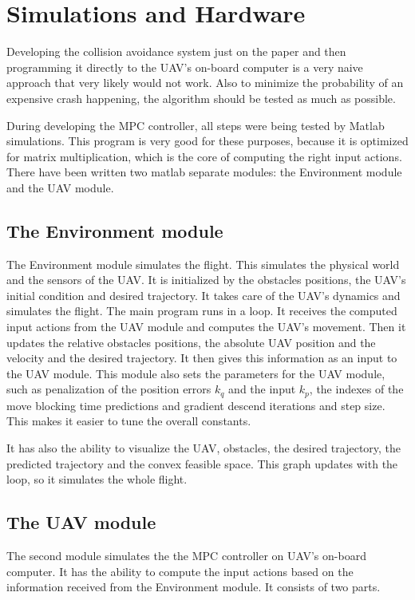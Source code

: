 \documentclass[a4paper,11pt,titlepage]{article}
\begin{document}
\section{Simulations and Hardware}

Developing the collision avoidance system just on the paper and then programming it directly to the UAV's on-board computer is a very naive approach that very likely would not work. Also to minimize the probability of an expensive crash happening, the algorithm should be tested as much as possible. 

During developing the MPC controller, all steps were being tested by Matlab simulations. This program is very good for these purposes, because it is optimized for matrix multiplication, which is the core of computing the right input actions. There have been written two matlab separate modules: the Environment module and the UAV module. 

\subsection{The Environment module}

The Environment module simulates the flight. This simulates the physical world and the sensors of the UAV. It is initialized by the obstacles positions, the UAV's initial condition and desired trajectory. It takes care of the UAV's dynamics and simulates the flight. The main program runs in a loop. It receives the computed input actions from the UAV module and computes the UAV's movement. Then it updates the relative obstacles positions, the absolute UAV position and the velocity and the desired trajectory. It then gives this information as an input to the UAV module. 
This module also sets the parameters for the UAV module, such as penalization of the position errors $k_q$ and the input $k_p$, the indexes of the move blocking time predictions and gradient descend iterations and step size. This makes it easier to tune the overall constants.

It has also the ability to visualize the UAV, obstacles, the desired trajectory, the predicted trajectory and the convex feasible space. This graph updates with the loop, so it simulates the whole flight. 

\subsection{The UAV module}

The second module simulates the the MPC controller on UAV's on-board computer. It has the ability to compute the input actions based on the information received from the Environment module. It consists of two parts. 
\end{document}
